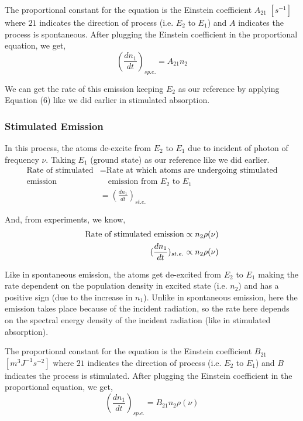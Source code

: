 \documentclass[12pt]{article}
\begin{document}
The proportional constant for the equation is the Einstein coefficient $A_{21}$ $[s^{-1}]$ where $21$ indicates the direction of process (i.e. $E_{2}$ to $E_{1}$) and $A$ indicates the process is spontaneous. After plugging the Einstein coefficient in the proportional equation, we get,
\begin{equation}
    (\frac{dn_{1}}{dt})_{sp.e.} = A_{21}n_{2}
\end{equation}

We can get the rate of this emission keeping $E_{2}$ as our reference by applying Equation (6) like we did earlier in stimulated absorption.

\subsubsection{Stimulated Emission}

In this process, the atoms de-excite from $E_{2}$ to $E_{1}$ due to incident of photon of frequency $\nu$. Taking $E_{1}$ (ground state) as our reference like we did earlier.
\begin{align*}
    \text{Rate of stimulated} & = \text{Rate at which atoms are undergoing stimulated} \\
    \text{emission} & \quad \text{emission from } E_{2} \text{ to } E_{1} \\ 
    & = (\frac{dn_{1}}{dt})_{st.e.}
\end{align*}

And, from experiments, we know, 
\begin{align*}
    \textnormal{Rate of stimulated emission} \propto n_{2}\rho(\nu) \\ 
    (\frac{dn_{1}}{dt})_{st.e.} \propto n_{2}\rho(\nu)
\end{align*}

Like in spontaneous emission, the atoms get de-excited from $E_{2}$ to $E_{1}$ making the rate dependent on the population density in excited state (i.e. $n_{2}$) and has a positive sign (due to the increase in $n_{1}$). Unlike in spontaneous emission, here the emission takes place because of the incident radiation, so the rate here depends on the spectral energy density of the incident radiation (like in stimulated absorption). \vspace{.2cm}

The proportional constant for the equation is the Einstein coefficient $B_{21}$ $[m^{3}J^{-1}s^{-2}]$ where $21$ indicates the direction of process (i.e. $E_{2}$ to $E_{1}$) and $B$ indicates the process is stimulated. After plugging the Einstein coefficient in the proportional equation, we get,
\begin{equation}
    (\frac{dn_{1}}{dt})_{sp.e.} = B_{21}n_{2}\rho(\nu)
\end{equation}
\end{document}
